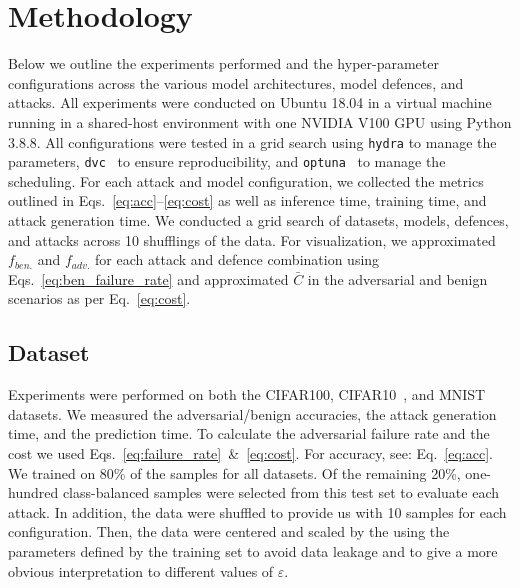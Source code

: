 \section{Methodology}
\label{methods}
Below we outline the experiments performed and the hyper-parameter configurations across the various model architectures, model defences, and attacks. All experiments were conducted on Ubuntu 18.04 in a virtual machine running in a shared-host environment with one NVIDIA V100 GPU using Python 3.8.8. All configurations were tested in a grid search using \texttt{hydra} \citep{hydra} to manage the parameters, \texttt{dvc}~\citep{dvc} to ensure reproducibility, and \texttt{optuna}~\citep{optuna} to manage the scheduling. For each attack and model configuration, we collected the metrics outlined in Eqs.~\ref{eq:acc}--\ref{eq:cost} as well as inference time, training time, and attack generation time. We conducted a grid search of datasets, models, defences, and attacks across 10 shufflings of the data. For visualization, we approximated $f_{ben.}$ and $f_{adv.}$ for each attack and defence combination using Eqs.~\ref{eq:ben_failure_rate} and approximated $\bar{C}$ in the adversarial and benign scenarios as per Eq.~\ref{eq:cost}.

\subsection{Dataset}
\label{dataset}
Experiments were performed on both the CIFAR100, CIFAR10~\citep{cifar}, and MNIST~\citep{mnist} datasets. We measured the adversarial/benign accuracies, the attack generation time, and the prediction time. To calculate the adversarial failure rate and the cost we used Eqs.~\ref{eq:failure_rate}~\&~\ref{eq:cost}. For accuracy, see: Eq.~\ref{eq:acc}. We trained on 80\% of the samples for all datasets. Of the remaining 20\%, one-hundred class-balanced samples were selected from this test set to evaluate each attack. In addition, the data were shuffled to provide us with 10 samples for each configuration. Then, the data were centered and scaled by the using the parameters defined by the training set to avoid data leakage and to give a more obvious interpretation to different values of $\varepsilon$.

